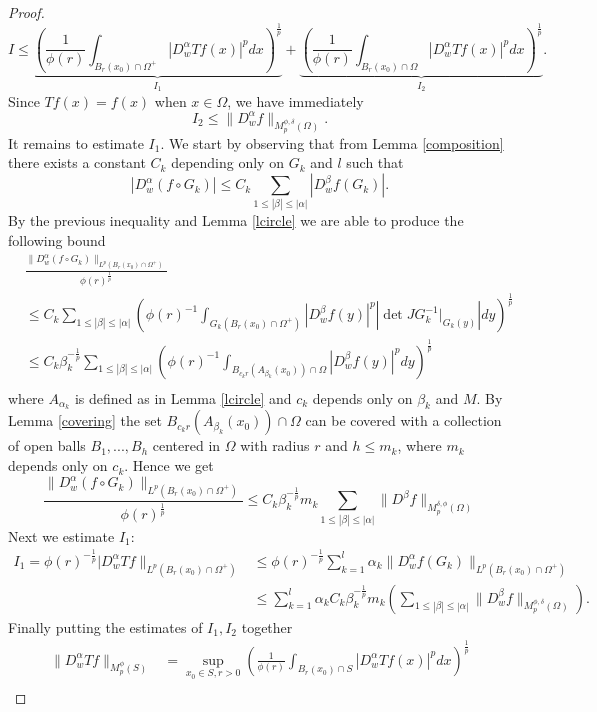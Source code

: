 \documentclass[12pt]{article}
\theoremstyle{definition}
\begin{document}
\begin{proof}
\[ I \le \underbrace{\left ( \frac{1}{\phi(r)} \int_{B_r(x_0)\cap \Omega^+} |D^\alpha_w Tf(x)|^pdx \right)^{\frac{1}{p}}}_\textrm{$I_1$}+\underbrace{\left ( \frac{1}{\phi(r)} \int_{B_r(x_0)\cap \Omega} |D^\alpha_w Tf(x)|^pdx \right)^{\frac{1}{p}}}_\textrm{$I_2$}.\]
Since $Tf(x)=f(x)$ when $ x\in\Omega$, we have immediately  
\[ I_2 \le \|D^\alpha_w f \|_{M_p^{\phi,\delta}(\Omega)} . \]
It remains to estimate $I_1$. We start by observing that from Lemma \ref{composition} there exists a constant $C_k$ depending only on $G_k$ and $l$ such that
\[ |D^{\alpha}_w (f \circ  G_k)| \le C_k \sum_{1\le |\beta|\le|\alpha| }| D^{\beta}_wf(G_k)|.\]
By the previous inequality and Lemma \ref{lcircle} we are able to produce the following bound
\begin{align*}
&\frac{\|D^{\alpha}_w(f \circ G_k) \|_{L^p(B_r(x_0)\cap \Omega^+)}}{\phi(r)^{\frac{1}{p}}} \\
&\le C_k \sum_{1\le |\beta|\le|\alpha| } \left(\phi(r)^{-1} \int_{G_k(B_r(x_0)\cap \Omega^+)} |D^\beta_wf(y)|^p|\det JG_k^{-1}\big|_{G_k(y)}|dy\right)^{\frac{1}{p}}\\
 		&\le C_k \beta_k^{-\frac{1}{p}} \sum_{1\le |\beta|\le|\alpha| } \left(\phi(r)^{-1} \int_{B_{c_kr}(A_{\beta_k}(x_0))\cap \Omega} |D^\beta_wf(y)|^pdy\right)^{\frac{1}{p}} 		\\		
\end{align*}
where $A_{\alpha_k}$ is defined as in Lemma \ref{lcircle} and $c_k$ depends only on $\beta_k$ and $M$. By Lemma \ref{covering} the set $B_{c_kr}(A_{\beta_k}(x_0))\cap \Omega$ can be covered with a collection of open balls $B_1,...,B_h$ centered in $\Omega$ with radius $r$ and $h\le m_k$, where $m_k$ depends only on $c_k$. Hence we get
\[ \frac{\|D^{\alpha}_w(f \circ G_k) \|_{L^p(B_r(x_0)\cap \Omega^+)}}{\phi(r)^{\frac{1}{p}}}\le C_k \beta_k^{-\frac{1}{p}} m_k \sum_{1\le |\beta|\le|\alpha| } \|D^\beta f\|_{M_p^{\delta,\phi}(\Omega)}\]
 Next we estimate $I_1$:
\begin{align*}
I_1 = \phi(r)^{-\frac{1}{p}}|D^\alpha_w Tf \|_{L^p(B_r(x_0)\cap \Omega^+)}&\le \phi(r)^{-\frac{1}{p}} \sum_{k=1}^l \alpha_k \|D^\alpha_w f(G_k) \|_{L^p(B_r(x_0)\cap \Omega^+)} \\
&\le \sum_{k=1}^l \alpha_kC_k\beta_k^{-\frac{1}{p}}m_k \left( \sum_{1\le |\beta|\le|\alpha| }\| D^\beta_wf\|_{M_p^{\phi,\delta}(\Omega)} \right).																	
\end{align*}
Finally putting the estimates of $I_1,I_2$ together 
\begin{align*}
\| D^\alpha_w Tf\|_{M_p^\phi(S)}&=\sup_{x_0 \in S, r>0} \left ( \frac{1}{\phi(r)} \int_{B_r(x_0)\cap S} |D^\alpha_w Tf(x)|^pdx \right)^{\frac{1}{p}} \\

\end{align*}
\end{proof}
\end{document}
